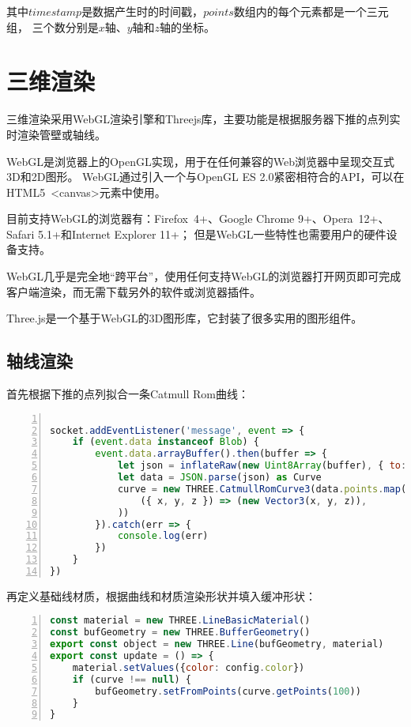 其中$timestamp$是数据产生时的时间戳，$points$数组内的每个元素都是一个三元组，
三个数分别是$x$轴、$y$轴和$z$轴的坐标。

\section{三维渲染}

三维渲染采用WebGL渲染引擎和Threejs库，主要功能是根据服务器下推的点列实时渲染管壁或轴线。

WebGL是浏览器上的OpenGL实现，用于在任何兼容的Web浏览器中呈现交互式3D和2D图形\cite{webgl}。
WebGL通过引入一个与OpenGL ES 2.0紧密相符合的API，可以在HTML5 <canvas>元素中使用。

目前支持WebGL的浏览器有：Firefox 4+、Google Chrome 9+、Opera 12+、Safari 5.1+和Internet Explorer 11+；
但是WebGL一些特性也需要用户的硬件设备支持。

WebGL几乎是完全地“跨平台”，使用任何支持WebGL的浏览器打开网页即可完成客户端渲染，而无需下载另外的软件或浏览器插件。

Three.js是一个基于WebGL的3D图形库\cite{threejs}，它封装了很多实用的图形组件。

\subsection{轴线渲染}

首先根据下推的点列拟合一条Catmull Rom曲线：

\begin{lstlisting}[language=JavaScript,
   backgroundcolor=\color{lightgray},
   extendedchars=true,
   basicstyle=\footnotesize\ttfamily,
   showstringspaces=false,
   showspaces=false,
   numbers=left,
   numberstyle=\footnotesize,
   numbersep=9pt,
   tabsize=2,
   breaklines=true,
   showtabs=false,
   captionpos=b]

socket.addEventListener('message', event => {
    if (event.data instanceof Blob) {
        event.data.arrayBuffer().then(buffer => {
            let json = inflateRaw(new Uint8Array(buffer), { to: 'string' })
            let data = JSON.parse(json) as Curve
            curve = new THREE.CatmullRomCurve3(data.points.map(
                ({ x, y, z }) => (new Vector3(x, y, z)),
            ))
        }).catch(err => {
            console.log(err)
        })
    }
})
\end{lstlisting}

再定义基础线材质，根据曲线和材质渲染形状并填入缓冲形状：

\begin{lstlisting}[language=JavaScript,
   backgroundcolor=\color{lightgray},
   extendedchars=true,
   basicstyle=\footnotesize\ttfamily,
   showstringspaces=false,
   showspaces=false,
   numbers=left,
   numberstyle=\footnotesize,
   numbersep=9pt,
   tabsize=2,
   breaklines=true,
   showtabs=false,
   captionpos=b]
const material = new THREE.LineBasicMaterial()
const bufGeometry = new THREE.BufferGeometry()
export const object = new THREE.Line(bufGeometry, material)
export const update = () => {
    material.setValues({color: config.color})
    if (curve !== null) {
        bufGeometry.setFromPoints(curve.getPoints(100))
    }
}
\end{lstlisting}

